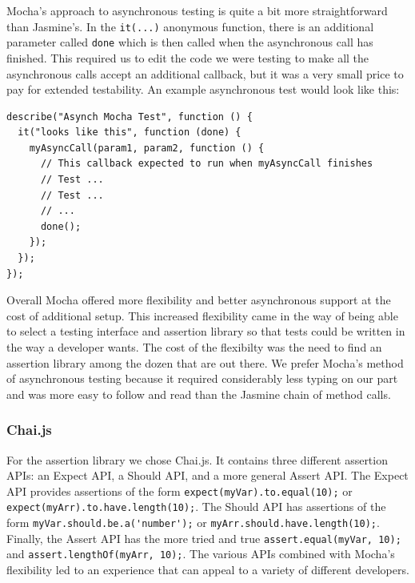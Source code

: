 \documentclass[12pt]{ucthesis}
\begin{document}
Mocha's approach to asynchronous testing is quite a bit more straightforward than Jasmine's. In the \lstinline{it(...)} anonymous function, there is an additional parameter called \lstinline{done} which is then called when the asynchronous call has finished. This required us to edit the code we were testing to make all the asynchronous calls accept an additional callback, but it was a very small price to pay for extended testability. An example asynchronous test would look like this:
\begin{lstlisting}
describe("Asynch Mocha Test", function () {
  it("looks like this", function (done) {
    myAsyncCall(param1, param2, function () { 
      // This callback expected to run when myAsyncCall finishes
      // Test ...
      // Test ...
      // ...
      done();
    });
  });
});
\end{lstlisting}

Overall Mocha offered more flexibility and better asynchronous support at the cost of additional setup. This increased flexibility came in the way of being able to select a testing interface and assertion library so that tests could be written in the way a developer wants. The cost of the flexibilty was the need to find an assertion library among the dozen that are out there. We prefer Mocha's method of asynchronous testing because it required considerably less typing on our part and was more easy to follow and read than the Jasmine chain of method calls.

\subsubsection{Chai.js}
For the assertion library we chose Chai.js\cite{Chaijs}. It contains three different assertion APIs: an Expect API, a Should API, and a more general Assert API. The Expect API provides assertions of the form \lstinline{expect(myVar).to.equal(10);} or \lstinline{expect(myArr).to.have.length(10);}. The Should API has assertions of the form \lstinline{myVar.should.be.a('number');} or \lstinline{myArr.should.have.length(10);}. Finally, the Assert API has the more tried and true \lstinline{assert.equal(myVar, 10);} and \lstinline{assert.lengthOf(myArr, 10);}. The various APIs combined with Mocha's flexibility led to an experience that can appeal to a variety of different developers.
\end{document}
